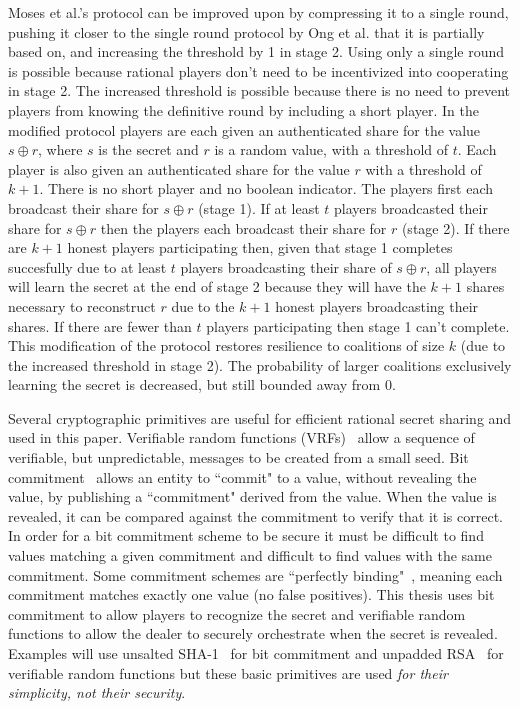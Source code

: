 \documentclass{dalcsthesis}
\begin{document}
Moses et al.'s protocol can be improved upon by compressing it to a single round, pushing it closer to the single round protocol by Ong et al.\cite{ong09} that it is partially based on, and increasing the threshold by 1 in stage 2. Using only a single round is possible because rational players don't need to be incentivized into cooperating in stage 2. The increased threshold is possible because there is no need to prevent players from knowing the definitive round by including a short player. In the modified protocol players are each given an authenticated share for the value $s \oplus r$, where $s$ is the secret and $r$ is a random value, with a threshold of $t$. Each player is also given an authenticated share for the value $r$ with a threshold of $k+1$. There is no short player and no boolean indicator. The players first each broadcast their share for $s \oplus r$ (stage 1). If at least $t$ players broadcasted their share for $s \oplus r$ then the players each broadcast their share for $r$ (stage 2). If there are $k+1$ honest players participating then, given that stage 1 completes succesfully due to at least $t$ players broadcasting their share of $s \oplus r$, all players will learn the secret at the end of stage 2 because they will have the $k+1$ shares necessary to reconstruct $r$ due to the $k+1$ honest players broadcasting their shares. If there are fewer than $t$ players participating then stage 1 can't complete. This modification of the protocol restores resilience to coalitions of size $k$ (due to the increased threshold in stage 2). The probability of larger coalitions exclusively learning the secret is decreased, but still bounded away from 0.

Several cryptographic primitives are useful for efficient rational secret sharing and used in this paper. Verifiable random functions (VRFs)~\cite{dis05, micali99} allow a sequence of verifiable, but unpredictable, messages to be created from a small seed. Bit commitment~\cite{Damg02, naor91} allows an entity to ``commit" to a value, without revealing the value, by publishing a ``commitment" derived from the value. When the value is revealed, it can be compared against the commitment to verify that it is correct. In order for a bit commitment scheme to be secure it must be difficult to find values matching a given commitment and difficult to find values with the same commitment. Some commitment schemes are ``perfectly binding"~\cite{Damg02}, meaning each commitment matches exactly one value (no false positives). This thesis uses bit commitment to allow players to recognize the secret and verifiable random functions to allow the dealer to securely orchestrate when the secret is revealed. Examples will use unsalted SHA-1~\cite{sha08} for bit commitment and unpadded RSA~\cite{rsa78} for verifiable random functions but these basic primitives are used \emph{for their simplicity, not their security}.
\end{document}
